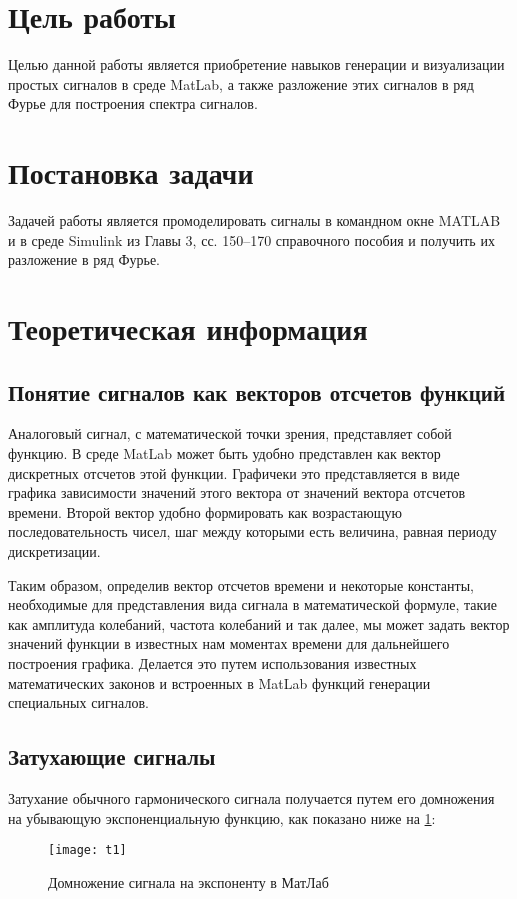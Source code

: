 







\section{Цель работы}
Целью данной работы является приобретение навыков генерации и визуализации простых сигналов в среде MatLab, а также разложение этих сигналов в ряд Фурье для построения спектра сигналов.

\section{Постановка задачи}
Задачей работы является промоделировать сигналы в командном окне MATLAB и в среде Simulink из Главы 3, сс. 150–170 справочного пособия и получить их разложение в ряд Фурье.

\section{Теоретическая информация}
\subsection{Понятие сигналов как векторов отсчетов функций}
Аналоговый сигнал, с математической точки зрения, представляет собой функцию. В среде  MatLab может быть удобно представлен как вектор дискретных отсчетов этой функции. Графичеки это представляется в виде графика зависимости значений этого вектора от значений вектора отсчетов времени. Второй вектор удобно формировать как возрастающую последовательность чисел, шаг между которыми есть величина, равная периоду дискретизации.

Таким образом, определив вектор отсчетов времени и некоторые константы, необходимые для представления вида сигнала в математической формуле, такие как амплитуда колебаний, частота колебаний и так далее, мы может задать вектор значений функции в известных нам моментах времени для дальнейшего построения графика. Делается это путем использования известных математических законов и встроенных в MatLab функций генерации специальных сигналов.

\subsection{Затухающие сигналы}
Затухание обычного гармонического сигнала получается путем его домножения на убывающую экспоненциальную функцию, как показано ниже на \ref{pic:t1}:
\begin{figure}[H]
	\begin{center}
		\texttt{[image: t1]}
		\caption{Домножение сигнала на экспоненту в МатЛаб} 
		\label{pic:t1} %
	\end{center}
\end{figure}

